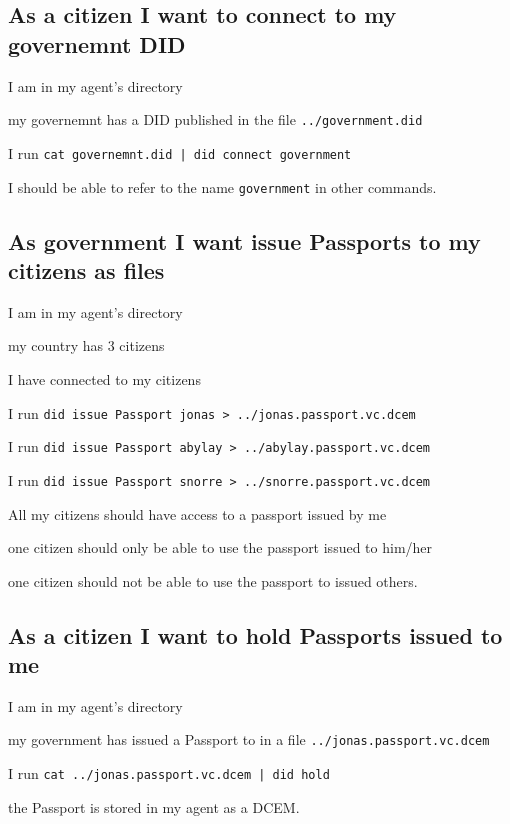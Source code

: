 \subsection{As a citizen I want to connect to my governemnt DID}
\begin{description}[1.35cm]
    \item[Given] I am in my agent's directory
    \item[and] my governemnt has a DID published in the file \texttt{../government.did}
    \item[When] I run \texttt{cat governemnt.did | did connect government}
    \item[Then] I should be able to refer to the name \texttt{government} in other commands.
\end{description}



\subsection{As government I want issue Passports to my citizens as files}
\begin{description}[1.35cm]
    \item[Given] I am in my agent's directory
    \item[and] my country has 3 citizens 
    \item[and] I have connected to my citizens
    \item[When] I run \texttt{did issue Passport jonas > ../jonas.passport.vc.dcem}
    \item[and] I run \texttt{did issue Passport abylay > ../abylay.passport.vc.dcem}
    \item[and] I run \texttt{did issue Passport snorre > ../snorre.passport.vc.dcem}
    \item[Then] All my citizens should have access to a passport issued by me
    \item[and] one citizen should only be able to use the passport issued to him/her
    \item[and] one citizen should not be able to use the passport to issued others.
\end{description}



\subsection{As a citizen I want to hold Passports issued to me}
\begin{description}[1.35cm]
    \item[Given] I am in my agent's directory
    \item[and] my government has issued a Passport to in a file \texttt{../jonas.passport.vc.dcem}
    \item[When] I run \texttt{cat ../jonas.passport.vc.dcem | did hold}
    \item[Then] the Passport is stored in my agent as a DCEM.
\end{description}



